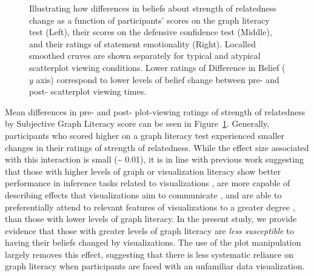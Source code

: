 \documentclass[manuscript,screen,review,anonymous]{acmart}
\begin{document}
\begin{figure}


\caption{\label{fig-add-analyses-plots}Illustrating how differences in
beliefs about strength of relatedness change as a function of
participants' scores on the graph literacy test (Left), their scores on
the defensive confidence test (Middle), and their ratings of statement
emotionality (Right). Localled smoothed cruves are shown separately for
typical and atypical scatterplot viewing conditions. Lower ratings of
Difference in Belief (\(y\) axis) correspond to lower levels of belief
change between pre- and post- scatterplot viewing times.}

\end{figure}%

Mean differences in pre- and post- plot-viewing ratings of strength of
relatedness by Subjective Graph Literacy score can be seen in
Figure~\ref{fig-add-analyses-plots}. Generally, participants who scored
higher on a graph literacy test experienced smaller changes in their
ratings of strength of relatedness. While the effect size associated
with this interaction is small (\textasciitilde{} 0.01), it is in line
with previous work suggesting that those with higher levels of graph or
visualization literacy show better performance in inference tasks
related to visualizations \citep{canham_2010}, are more capable of
describing effects that visualizations aim to communicate
\citep{shah_2011}, and are able to preferentially attend to relevant
features of visualizations to a greater degree \citep{okan_2016}, than
those with lower levels of graph literacy. In the present study, we
provide evidence that those with greater levels of graph literacy are
\emph{less susceptible} to having their beliefs changed by
visualizations. The use of the plot manipulation largely removes this
effect, suggesting that there is less systematic reliance on graph
literacy when participants are faced with an unfamiliar data
visualization.
\end{document}
